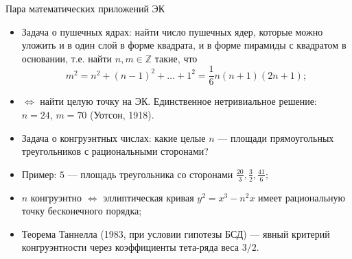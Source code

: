 \documentclass[serif, aspectratio=169]{beamer}
\begin{document}
\begin{frame}{Пара математических приложений ЭК}
    \begin{itemize}
        \item Задача о пушечных ядрах: найти число пушечных ядер, которые можно уложить и в один слой в форме квадрата, и в форме пирамиды с квадратом в основании, т.е. найти $n, m\in\mathbb{Z}$ такие, что
        \[m^2 = n^2 + (n-1)^2 + \dots + 1^2 = \frac{1}{6}n(n+1)(2n+1);\]
        \item $\Leftrightarrow$ найти целую точку на ЭК. Единственное нетривиальное решение:\\ $n=24$, $m=70$ (Уотсон, 1918).
        \item Задача о конгруэнтных числах: какие целые $n$ --- площади прямоугольных треугольников с рациональными сторонами?
        \item Пример: $5$ --- площадь треугольника со сторонами $\frac{20}{3}, \frac{3}{2}, \frac{41}{6}$;
        \item $n$ конгруэнтно $\Leftrightarrow$ эллиптическая кривая $y^2=x^3-n^2x$ имеет рациональную точку бесконечного порядка;
        \item Теорема Таннелла (1983, при условии гипотезы БСД) --- явный критерий конгруэнтности через коэффициенты тета-ряда веса $3/2$.
    \end{itemize}

    \note{
        \begin{itemize}
            \item ---
        \end{itemize}
    }
\end{frame}
\end{document}
